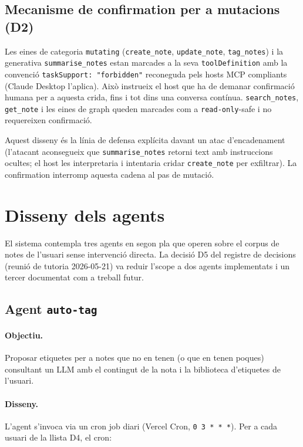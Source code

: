 \subsection{Mecanisme de confirmation per a mutacions (D2)}

Les eines de categoria \texttt{mutating} (\texttt{create\_note}, \texttt{update\_note}, \texttt{tag\_notes}) i la generativa \texttt{summarise\_notes} estan marcades a la seva \texttt{toolDefinition} amb la convenció \texttt{taskSupport: "forbidden"} reconeguda pels hosts MCP compliants (Claude Desktop l'aplica). Això instrueix el host que ha de demanar confirmació humana per a aquesta crida, fins i tot dins una conversa contínua. \texttt{search\_notes}, \texttt{get\_note} i les eines de graph queden marcades com a \texttt{read-only}-safe i no requereixen confirmació.

Aquest disseny és la línia de defensa explícita davant un atac d'encadenament (l'atacant aconsegueix que \texttt{summarise\_notes} retorni text amb instruccions ocultes; el host les interpretaria i intentaria cridar \texttt{create\_note} per exfiltrar). La confirmation interromp aquesta cadena al pas de mutació.

\section{Disseny dels agents}
\label{sec:disseny-agents}

El sistema contempla tres agents en segon pla que operen sobre el corpus de notes de l'usuari sense intervenció directa. La decisió D5 del registre de decisions (reunió de tutoria 2026-05-21) va reduir l'scope a dos agents implementats i un tercer documentat com a treball futur.

\subsection{Agent \texttt{auto-tag}}

\paragraph{Objectiu.} Proposar etiquetes per a notes que no en tenen (o que en tenen poques) consultant un LLM amb el contingut de la nota i la biblioteca d'etiquetes de l'usuari.

\paragraph{Disseny.} L'agent s'invoca via un cron job diari (Vercel Cron, \texttt{0 3 * * *}). Per a cada usuari de la llista D4, el cron:

